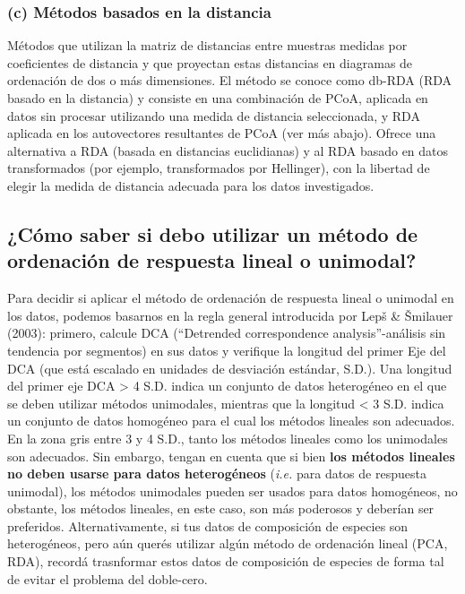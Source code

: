 \documentclass[
]{book}
\begin{document}
\hypertarget{c-muxe9todos-basados-en-la-distancia}{%
\subsubsection{(c) Métodos basados en la distancia}\label{c-muxe9todos-basados-en-la-distancia}}

Métodos que utilizan la matriz de distancias entre muestras medidas por coeficientes de distancia y que proyectan estas distancias en diagramas de ordenación de dos o más dimensiones. El método se conoce como db-RDA (RDA basado en la distancia) y consiste en una combinación de PCoA, aplicada en datos sin procesar utilizando una medida de distancia seleccionada, y RDA aplicada en los autovectores resultantes de PCoA (ver más abajo). Ofrece una alternativa a RDA (basada en distancias euclidianas) y al RDA basado en datos transformados (por ejemplo, transformados por Hellinger), con la libertad de elegir la medida de distancia adecuada para los datos investigados.

\hypertarget{cuxf3mo-saber-si-debo-utilizar-un-muxe9todo-de-ordenaciuxf3n-de-respuesta-lineal-o-unimodal}{%
\subsection{¿Cómo saber si debo utilizar un método de ordenación de respuesta lineal o unimodal?}\label{cuxf3mo-saber-si-debo-utilizar-un-muxe9todo-de-ordenaciuxf3n-de-respuesta-lineal-o-unimodal}}

Para decidir si aplicar el método de ordenación de respuesta lineal o unimodal en los datos, podemos basarnos en la regla general introducida por Lepš \& Šmilauer (2003): primero, calcule DCA (``Detrended correspondence analysis''-análisis sin tendencia por segmentos) en sus datos y verifique la longitud del primer Eje del DCA (que está escalado en unidades de desviación estándar, S.D.). Una longitud del primer eje DCA \textgreater{} 4 S.D. indica un conjunto de datos heterogéneo en el que se deben utilizar métodos unimodales, mientras que la longitud \textless{} 3 S.D. indica un conjunto de datos homogéneo para el cual los métodos lineales son adecuados. En la zona gris entre 3 y 4 S.D., tanto los métodos lineales como los unimodales son adecuados. Sin embargo, tengan en cuenta que si bien \textbf{los métodos lineales no deben usarse para datos heterogéneos} (\emph{i.e.} para datos de respuesta unimodal), los métodos unimodales pueden ser usados para datos homogéneos, no obstante, los métodos lineales, en este caso, son más poderosos y deberían ser preferidos.
Alternativamente, si tus datos de composición de especies son heterogéneos, pero aún querés utilizar algún método de ordenación lineal (PCA, RDA), recordá trasnformar estos datos de composición de especies de forma tal de evitar el problema del doble-cero.
\end{document}
